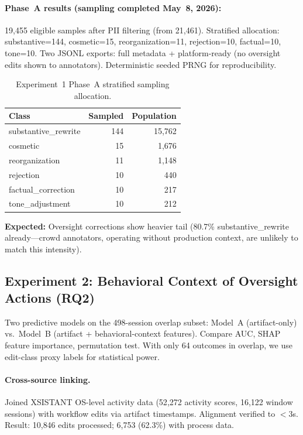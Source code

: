 \documentclass[11pt]{article}
\begin{document}
\paragraph{Phase~A results (sampling completed May~8, 2026):}
19{,}455 eligible samples after PII filtering (from 21{,}461).
Stratified allocation: substantive=144, cosmetic=15, reorganization=11, rejection=10, factual=10, tone=10.
Two JSONL exports: full metadata + platform-ready (no oversight edits shown to annotators).
Deterministic seeded PRNG for reproducibility.

\begin{table}[h]
\centering
\caption{Experiment~1 Phase~A stratified sampling allocation.}
\label{tab:exp1-sampling}
\begin{tabular}{@{}lrr@{}}
\toprule
\textbf{Class} & \textbf{Sampled} & \textbf{Population} \\
\midrule
substantive\_rewrite   & 144 & 15{,}762 \\
cosmetic              & 15  & 1{,}676 \\
reorganization        & 11  & 1{,}148 \\
rejection             & 10  & 440 \\
factual\_correction   & 10  & 217 \\
tone\_adjustment      & 10  & 212 \\
\bottomrule
\end{tabular}
\end{table}

\textbf{Expected:} Oversight corrections show heavier tail (80.7\% substantive\_rewrite already---crowd annotators, operating without production context, are unlikely to match this intensity).

\subsection{Experiment 2: Behavioral Context of Oversight Actions (RQ2)}
\label{sec:exp2}

Two predictive models on the 498-session overlap subset: Model~A (artifact-only) vs.\ Model~B (artifact + behavioral-context features).
Compare AUC, SHAP feature importance, permutation test.
With only 64 outcomes in overlap, we use edit-class proxy labels for statistical power.

\paragraph{Cross-source linking.}
Joined XSISTANT OS-level activity data (52{,}272 activity scores, 16{,}122 window sessions) with workflow edits via artifact timestamps.
Alignment verified to $<$3s.
Result: 10{,}846 edits processed; 6{,}753 (62.3\%) with process data.
\end{document}
